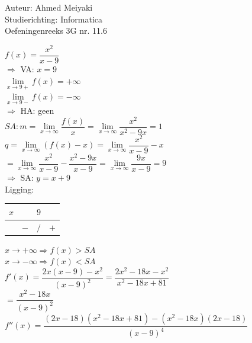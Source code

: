 \documentclass[a4paper]{article}
\begin{document}
  
\noindent \large Auteur: Ahmed Meiyaki \\
\noindent \large Studierichting: Informatica\\
\noindent \large Oefeningenreeks 3G nr. 11.6\\

\medskip

\normalsize

$f(x) = \dfrac{x^2}{x-9} $\\

$\Rightarrow $ VA: $x = 9 $\\

$\lim\limits_{x\rightarrow 9+} f(x) = +\infty $\\

$\lim\limits_{x\rightarrow 9-} f(x) = -\infty $\\

$\Rightarrow$ HA: geen$ $\\

$SA: m = \lim\limits_{x \to \infty} \dfrac{f(x)}{x} = \lim\limits_{x \to \infty} \dfrac{x^2}{x^2 - 9x}  = 1$\\

$q = \lim\limits_{x \to \infty} \left(f(x) - x\right) = \lim\limits_{x \to \infty} \dfrac{x^2}{x - 9} - x$\\

$= \lim\limits_{x \to \infty} \dfrac{x^2}{x - 9} - \dfrac{x^2 - 9x}{x - 9} = \lim\limits_{x \to \infty} \dfrac{9x}{x - 9} = 9$\\

$\Rightarrow$ SA: $y = x + 9 $\\

Ligging:
\begin{tabular}{c|ccc}
	$x$ &     &   $9$   &   \\ \hline
		&  $-$  &   $/$   & $+$ \\
\end{tabular}

$x \rightarrow +\infty\Rightarrow f(x) > SA $\\

$x \rightarrow -\infty\Rightarrow f(x) < SA $\\

$f'(x) = \dfrac{2x\left(x-9\right) - x^2}{\left(x-9\right)^2} = \dfrac{2x^2 - 18x - x^2}{x^2 -18x + 81} $\\

$= \dfrac{x^2 - 18x}{\left(x - 9\right)^2} $\\

$f''(x) = \dfrac{\left(2x - 18\right)\left(x^2 - 18x + 81\right) - \left(x^2 -18x\right)\left(2x - 18\right)}{\left(x - 9\right)^4} $\\
\end{document}
